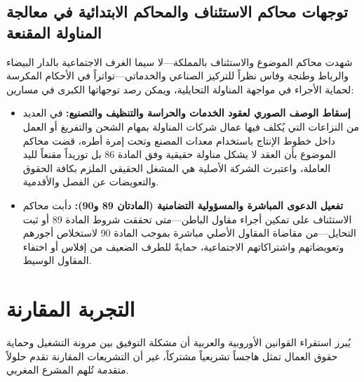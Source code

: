 \subsection{توجهات محاكم الاستئناف والمحاكم الابتدائية في معالجة المناولة المقنعة}
شهدت محاكم الموضوع والاستئناف بالمملكة—لا سيما الغرف الاجتماعية بالدار البيضاء والرباط وطنجة وفاس نظراً للتركيز الصناعي والخدماتي—تواتراً في الأحكام المكرسة لحماية الأجراء في مواجهة المناولة التحايلية، ويمكن رصد توجهاتها الكبرى في مسارين:
\begin{itemize}[leftmargin=*, itemsep=5pt]
    \item \textbf{إسقاط الوصف الصوري لعقود الخدمات والحراسة والتنظيف والتصنيع:} في العديد من النزاعات التي يُكلف فيها عمال شركات المناولة بمهام الشحن والتفريغ أو العمل داخل خطوط الإنتاج باستخدام معدات المصنع وتحت إمرة أطره، قضت محاكم الموضوع بأن العقد لا يشكل مناولة حقيقية وفق المادة \textenglish{86} بل توريداً مقنعاً لليد العاملة، واعتبرت الشركة الأصلية هي المشغل الحقيقي الملزم بكافة الحقوق والتعويضات عن الفصل والأقدمية.
    \item \textbf{تفعيل الدعوى المباشرة والمسؤولية التضامنية (المادتان \textenglish{89} و\textenglish{90}):} دأبت محاكم الاستئناف على تمكين أجراء مقاول الباطن—متى تحققت شروط المادة \textenglish{89} أو ثبت التحايل—من مقاضاة المقاول الأصلي مباشرة بموجب المادة \textenglish{90} لاستخلاص أجورهم وتعويضاتهم واشتراكاتهم الاجتماعية، حمايةً للطرف الضعيف من إفلاس أو اختفاء المقاول الوسيط.
\end{itemize}

\section{التجربة المقارنة}

يُبرز استقراء القوانين الأوروبية والعربية أن مشكلة التوفيق بين مرونة التشغيل وحماية حقوق العمال تمثل هاجساً تشريعياً مشتركاً، غير أن التشريعات المقارنة تقدم حلولاً متقدمة تُلهم المشرع المغربي.

